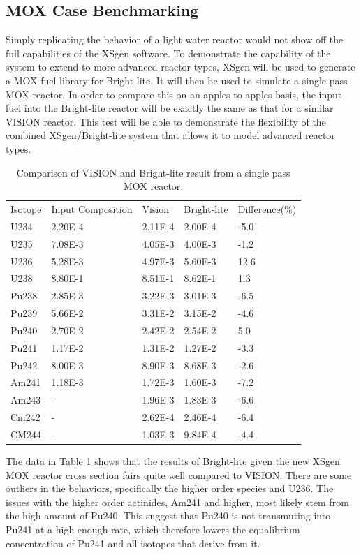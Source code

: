 \documentclass{article}
\begin{document}
\subsection{MOX Case Benchmarking}
Simply replicating the behavior of a light water reactor would not show off the full capabilities of the XSgen software. To demonstrate the capability of the system to extend to more advanced reactor types, XSgen will be used to generate a MOX fuel library for Bright-lite. It will then be used to simulate a single pass MOX reactor. In order to compare this on an apples to apples basis, the input fuel into the Bright-lite reactor will be exactly the same as that for a similar VISION reactor. This test will be able to demonstrate the flexibility of the combined XSgen/Bright-lite system that allows it to model advanced reactor types.

\begin{table}[!htb]
\centering
\caption{Comparison of VISION and Bright-lite result from a single pass MOX reactor.}
\label{tab:g}
\begin{tabular}{lllll}
Isotope & Input Composition & Vision & Bright-lite & Difference(\%) \\
U234 & 2.20E-4 & 2.11E-4 & 2.00E-4 & -5.0\\
U235 & 7.08E-3 & 4.05E-3 & 4.00E-3 & -1.2\\
U236 & 5.28E-3 & 4.97E-3 & 5.60E-3 & 12.6\\
U238 & 8.80E-1 & 8.51E-1 & 8.62E-1 & 1.3\\
Pu238 & 2.85E-3 & 3.22E-3 & 3.01E-3 & -6.5\\
Pu239 & 5.66E-2 & 3.31E-2 & 3.15E-2 & -4.6\\
Pu240 & 2.70E-2 & 2.42E-2 & 2.54E-2 & 5.0\\
Pu241 & 1.17E-2 & 1.31E-2 & 1.27E-2 & -3.3\\
Pu242 & 8.00E-3 & 8.90E-3 & 8.68E-3 & -2.6\\
Am241 & 1.18E-3 & 1.72E-3 & 1.60E-3 & -7.2\\
Am243 & - & 1.96E-3 & 1.83E-3 & -6.6\\
Cm242 & - & 2.62E-4 & 2.46E-4 & -6.4\\
CM244 & - & 1.03E-3 & 9.84E-4 & -4.4
\end{tabular}
\end{table}

The data in Table \ref{tab:g} shows that the results of Bright-lite given the new XSgen MOX reactor cross section fairs quite well compared to VISION. There are some outliers in the behaviors, specifically the higher order species and U236. The issues with the higher order actinides, Am241 and higher, most likely stem from the high amount of Pu240. This suggest that Pu240 is not transmuting into Pu241 at a high enough rate, which therefore lowers the equalibrium concentration of Pu241 and all isotopes that derive from it.
\end{document}
